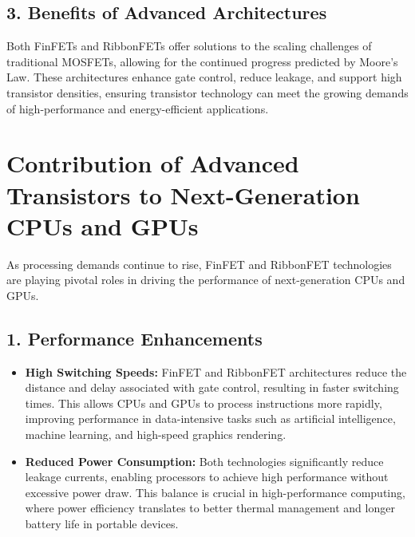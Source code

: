 \documentclass[12pt]{report}
\begin{document}
\begin{titlepage}
\subsection*{3. Benefits of Advanced Architectures}
Both FinFETs and RibbonFETs offer solutions to the scaling challenges of traditional MOSFETs, allowing for the continued progress predicted by Moore’s Law. These architectures enhance gate control, reduce leakage, and support high transistor densities, ensuring transistor technology can meet the growing demands of high-performance and energy-efficient applications.

\section{Contribution of Advanced Transistors to Next-Generation CPUs and GPUs}

As processing demands continue to rise, FinFET and RibbonFET technologies are playing pivotal roles in driving the performance of next-generation CPUs and GPUs.

\subsection*{1. Performance Enhancements}
\begin{itemize}
    \item \textbf{High Switching Speeds:} FinFET and RibbonFET architectures reduce the distance and delay associated with gate control, resulting in faster switching times. This allows CPUs and GPUs to process instructions more rapidly, improving performance in data-intensive tasks such as artificial intelligence, machine learning, and high-speed graphics rendering.
    \item \textbf{Reduced Power Consumption:} Both technologies significantly reduce leakage currents, enabling processors to achieve high performance without excessive power draw. This balance is crucial in high-performance computing, where power efficiency translates to better thermal management and longer battery life in portable devices.
\end{itemize}


\end{titlepage}
\end{document}
